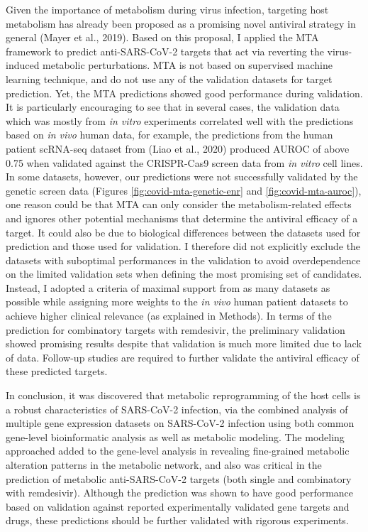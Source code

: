 \documentclass[12pt,twoside,openany,\mydriver]{thesis}  %
\begin{document}
Given the importance of metabolism during virus infection, targeting host metabolism has already been proposed as a promising novel antiviral strategy in general (Mayer et al., 2019). Based on this proposal, I applied the MTA framework to predict anti-SARS-CoV-2 targets that act via reverting the virus-induced metabolic perturbations. MTA is not based on supervised machine learning technique, and do not use any of the validation datasets for target prediction. Yet, the MTA predictions showed good performance during validation. It is particularly encouraging to see that in several cases, the validation data which was mostly from \emph{in vitro} experiments correlated well with the predictions based on \emph{in vivo} human data, for example, the predictions from the human patient scRNA-seq dataset from (Liao et al., 2020) produced AUROC of above 0.75 when validated against the CRISPR-Cas9 screen data from \emph{in vitro} cell lines. In some datasets, however, our predictions were not successfully validated by the genetic screen data (Figures \ref{fig:covid-mta-genetic-enr} and \ref{fig:covid-mta-auroc}), one reason could be that MTA can only consider the metabolism-related effects and ignores other potential mechanisms that determine the antiviral efficacy of a target. It could also be due to biological differences between the datasets used for prediction and those used for validation. I therefore did not explicitly exclude the datasets with suboptimal performances in the validation to avoid overdependence on the limited validation sets when defining the most promising set of candidates. Instead, I adopted a criteria of maximal support from as many datasets as possible while assigning more weights to the \emph{in vivo} human patient datasets to achieve higher clinical relevance (as explained in Methods). In terms of the prediction for combinatory targets with remdesivir, the preliminary validation showed promising results despite that validation is much more limited due to lack of data. Follow-up studies are required to further validate the antiviral efficacy of these predicted targets.

In conclusion, it was discovered that metabolic reprogramming of the host cells is a robust characteristics of SARS-CoV-2 infection, via the combined analysis of multiple gene expression datasets on SARS-CoV-2 infection using both common gene-level bioinformatic analysis as well as metabolic modeling. The modeling approached added to the gene-level analysis in revealing fine-grained metabolic alteration patterns in the metabolic network, and also was critical in the prediction of metabolic anti-SARS-CoV-2 targets (both single and combinatory with remdesivir). Although the prediction was shown to have good performance based on validation against reported experimentally validated gene targets and drugs, these predictions should be further validated with rigorous experiments.
\end{document}
